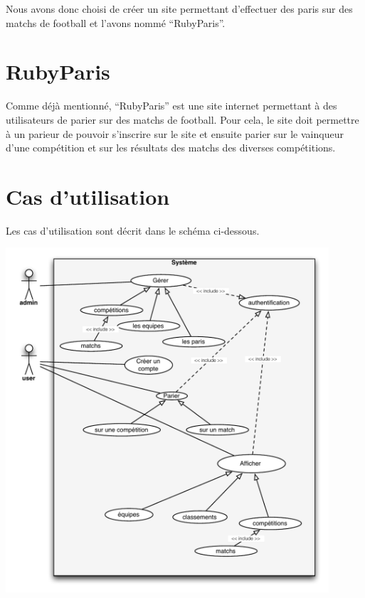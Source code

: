 \documentclass[10pt,a4paper,titlepage]{article}
\begin{document}
Nous avons donc choisi de créer un site permettant d'effectuer des paris sur des matchs de football et l'avons nommé “RubyParis”.

\section{RubyParis}

Comme déjà mentionné, “RubyParis” est une site internet permettant à des utilisateurs de parier sur des matchs de football. Pour cela, le site doit permettre à un parieur de pouvoir s'inscrire sur le site et ensuite parier sur le vainqueur d'une compétition et sur les résultats des matchs des diverses compétitions. 

\section{Cas d'utilisation}\label{casUtilisation}

Les cas d'utilisation sont décrit dans le schéma ci-dessous.

\includegraphics[width=12cm]{imgs/cas_utilisation-notitle.pdf}
\end{document}
